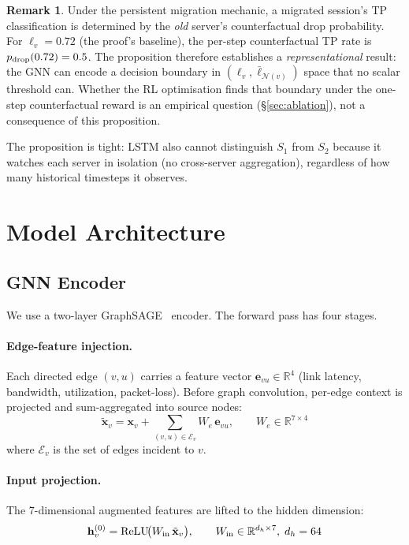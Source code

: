 \documentclass[review,1p]{elsarticle}
\theoremstyle{definition}
\newtheorem{remark}{Remark}
\begin{document}
\begin{remark}
Under the persistent migration mechanic, a migrated session's TP
classification is determined by the \emph{old} server's counterfactual
drop probability.  For $\ell_v = 0.72$ (the proof's baseline), the
per-step counterfactual TP rate is $p_{\rm drop}(0.72) = 0.5$.  The
proposition therefore establishes a \emph{representational} result:
the GNN can encode a decision boundary in $(\ell_v, \bar{\ell}_{\mathcal{N}(v)})$ space
that no scalar threshold can.  Whether the RL optimisation finds that
boundary under the one-step counterfactual reward is an empirical
question (\S\ref{sec:ablation}), not a consequence of this proposition.
\end{remark}

\noindent
The proposition is tight: LSTM also cannot distinguish $S_1$ from
$S_2$ because it watches each server in isolation (no cross-server
aggregation), regardless of how many historical timesteps it observes.

\section{Model Architecture}
\label{sec:model}

\subsection{GNN Encoder}

We use a two-layer GraphSAGE~\cite{graphsage} encoder.
The forward pass has four stages.

\paragraph{Edge-feature injection.}
Each directed edge $(v, u)$ carries a feature vector
$\mathbf{e}_{vu} \in \mathbb{R}^4$
(link latency, bandwidth, utilization, packet-loss).
Before graph convolution, per-edge context is projected and sum-aggregated
into source nodes:
\begin{equation}
  \tilde{\mathbf{x}}_v = \mathbf{x}_v
    + \sum_{(v,u)\in\mathcal{E}_v} W_e\,\mathbf{e}_{vu},
  \qquad W_e \in \mathbb{R}^{7 \times 4}
  \label{eq:edge_inject}
\end{equation}
where $\mathcal{E}_v$ is the set of edges incident to $v$.

\paragraph{Input projection.}
The 7-dimensional augmented features are lifted to the hidden dimension:
\begin{equation}
  \mathbf{h}_v^{(0)} = \text{ReLU}\!\bigl(W_{\rm in}\,\tilde{\mathbf{x}}_v\bigr),
  \qquad W_{\rm in} \in \mathbb{R}^{d_h \times 7},\; d_h = 64
  \label{eq:input_proj}
\end{equation}
\end{document}
